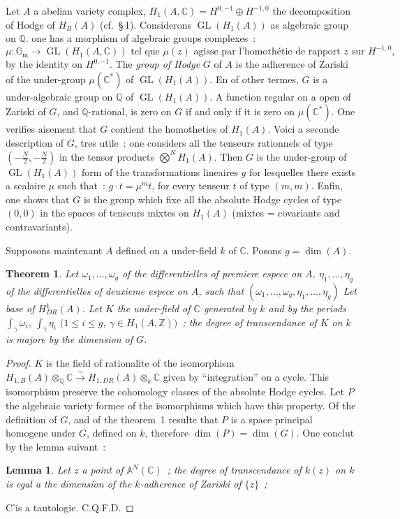 \documentclass[12pt,a4paper]{article}
\theoremstyle{plain}
\newtheorem{theorem}{Theorem}
\newtheorem{lemma}{Lemma}
\theoremstyle{definition}
\theoremstyle{remark}
\newcommand{\ZZ}{\mathbb{Z}}
\newcommand{\QQ}{\mathbb{Q}}
\newcommand{\CC}{\mathbb{C}}
\newcommand{\Gm}{\mathbb{G}_\mathrm{m}}
\providecommand{\AA}{\mathbb{A}}
\providecommand{\CC}{\mathbb{C}}
\providecommand{\QQ}{\mathbb{Q}}
\providecommand{\ZZ}{\mathbb{Z}}
\providecommand{\Gm}{\mathbb{G}_{\mathrm m}}
\providecommand{\GL}{\operatorname{GL}}
\begin{document}
Let $A$ a abelian variety complex, $H_1(A, \CC) = H^{0,-1} \oplus H^{-1,0}$ the decomposition of Hodge of $H_B(A)$ (cf.~\S\,1). Considerons $\GL(H_1(A))$ as algebraic group on $\QQ$. one has a morphism of algebraic groups complexes~:
\[
\mu : \Gm \to \GL(H_1(A, \CC)) \text{ tel que } \mu(z) \text{ agisse par l'homothétie de rapport } z \text{ sur } H^{-1,0},
\]
by the identity on $H^{0,-1}$. The \emph{group of Hodge} $G$ of $A$ is the adherence of Zariski of the under-group $\mu(\CC^*)$ of $\GL(H_1(A))$. En of other termes, $G$ is a under-algebraic group on $\QQ$ of $\GL(H_1(A))$. A function regular on a open of Zariski of $G$, and $\QQ$-rational, is zero on $G$ if and only if it is zero on $\mu(\CC^*)$. One verifies aisement that $G$ contient the homotheties of $H_1(A)$. Voici a seconde description of $G$, tres utile~: one considers all the tenseurs rationnels of type $(-\frac{N}{2}, -\frac{N}{2})$ in the tensor products $\bigotimes^N H_1(A)$. Then $G$ is the under-group of $\GL(H_1(A))$ form of the transformations lineaires $g$ for lesquelles there exists a scalaire $\mu$ such that~: $g \cdot t = \mu^m t$, for every tenseur $t$ of type $(m,m)$. Enfin, one shows that $G$ is the group which fixe all the absolute Hodge cycles of type $(0,0)$ in the spaces of tenseurs mixtes on $H_1(A)$ (mixtes = covariants and contravariants).

Supposons maintenant $A$ defined on a under-field $k$ of $\CC$. Posons $g = \dim(A)$.

\begin{theorem}
Let $\omega_1, \ldots, \omega_g$ of the differentielles of premiere espece on $A$, $\eta_1, \ldots, \eta_g$ of the differentielles of deuxieme espece on $A$, such that $(\omega_1, \ldots, \omega_g, \eta_1, \ldots, \eta_g)$ Let base of $H^1_{DR}(A)$. Let $K$ the under-field of $\CC$ generated by $k$ and by the periods $\int_\gamma \omega_i$, $\int_\gamma \eta_i$ $(1 \leq i \leq g$, $\gamma \in H_1(A, \ZZ))$~; the degree of transcendance of $K$ on $k$ is majore by the dimension of $G$.
\end{theorem}

\begin{proof}[Proof]
$K$ is the field of rationalite of the isomorphism $H_{1,B}(A) \otimes_\QQ \CC \xrightarrow{\sim} H_{1,DR}(A) \otimes_k \CC$ given by ``integration'' on a cycle. This isomorphism preserve the cohomology classes of the absolute Hodge cycles. Let $P$ the algebraic variety formee of the isomorphisms which have this property. Of the definition of $G$, and of the theorem~1 resulte that $P$ is a space principal homogene under $G$, defined on $k$, therefore $\dim(P) = \dim(G)$. One conclut by the lemma suivant~:

\begin{lemma}
Let $z$ a point of $\AA^N(\CC)$~; the degree of transcendance of $k(z)$ on $k$ is egal a the dimension of the $k$-adherence of Zariski of $\{z\}$~;
\end{lemma}
\noindent C'is a tautologie. \hfill C.Q.F.D.
\end{proof}
\end{document}
